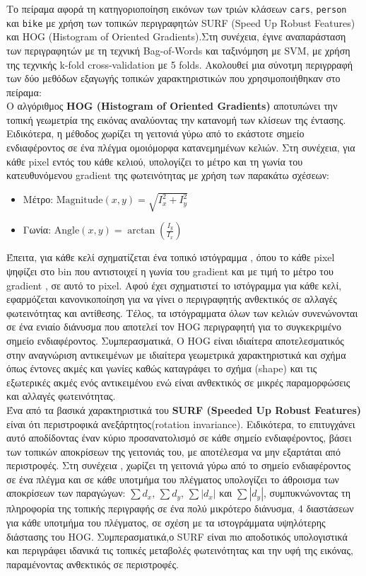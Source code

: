 \documentclass[12pt, a4paper]{article}
\begin{document}
 Το πείραμα αφορά τη
κατηγοριοποίηση εικόνων των τριών κλάσεων \texttt{cars}, \texttt{person} και
\texttt{bike} με χρήση των τοπικών περιγραφητών SURF (Speed Up Robust Features)
και HOG (Histogram of Oriented Gradients).Στη συνέχεια, έγινε αναπαράσταση των περιγραφητών με τη τεχνική Bag-of-Words και ταξινόμηση με 
SVM, με χρήση της τεχνικής k-fold cross-validation με 5 folds.
Ακολουθεί μια σύνοτμη περιγρραφή των δύο μεθόδων εξαγωγής τοπικών χαρακτηριστικών που χρησιμοποιήθηκαν στο πείραμα:\\
Ο αλγόριθμος \textbf{HOG (Histogram of Oriented Gradients)} αποτυπώνει την τοπική γεωμετρία της εικόνας αναλύοντας την κατανομή των κλίσεων της έντασης.
Ειδικότερα, η μέθοδος χωρίζει τη γειτονιά γύρω από το εκάστοτε σημείο ενδιαφέροντος σε ένα πλέγμα ομοιόμορφα κατανεμημένων κελιών. Στη συνέχεια, για κάθε pixel εντός του κάθε κελιού,
υπολογίζει το μέτρο και τη γωνία του κατευθυνόμενου gradient της φωτεινότητας με χρήση των παρακάτω σχέσεων:
\begin{itemize}
    \item Μέτρο: $\displaystyle \mathrm{Magnitude}(x,y) = \sqrt{I_x^2 + I_y^2}$
    
    \vspace{0.3cm}
    
    \item Γωνία: $\displaystyle \mathrm{Angle}(x,y) = \arctan\!\left(\frac{I_y}{I_x}\right)$
\end{itemize}
Έπειτα, για κάθε κελί σχηματίζεται ένα τοπικό ιστόγραμμα , όπου το κάθε pixel ψηφίζει στο bin που αντιστοιχεί η γωνία του gradient και με τιμή το μέτρο του gradient , σε αυτό το pixel. Αφού έχει σχηματιστεί το ιστόγραμμα για κάθε κελί, εφαρμόζεται κανονικοποίηση για να γίνει ο περιγραφητής ανθεκτικός σε αλλαγές φωτεινότητας και αντίθεσης. Τέλος, τα ιστόγραμματα όλων των κελιών συνενώνονται σε ένα ενιαίο διάνυσμα που αποτελεί τον HOG περιγραφητή για το συγκεκριμένο σημείο ενδιαφέροντος.
Συμπερασματικά, Ο HOG είναι ιδιαίτερα αποτελεσματικός στην αναγνώριση αντικειμένων με ιδιαίτερα γεωμετρικά χαρακτηριστικά και σχήμα όπως έντονες ακμές και γωνίες καθώς καταγράφει το σχήμα (shape) και τις εξωτερικές ακμές ενός αντικειμένου ενώ είναι ανθεκτικός σε μικρές παραμορφώσεις και αλλαγές φωτεινότητας.\\

Ένα από τα βασικά χαρακτηριστικά του \textbf{SURF (Speeded Up Robust Features)} είναι ότι περιστροφικά ανεξάρτητος(rotation invariance). Ειδικότερα, το επιτυγχάνει αυτό αποδίδοντας έναν κύριο προσανατολισμό σε κάθε σημείο ενδιαφέροντος, βάσει των τοπικών αποκρίσεων της γειτονιάς του, με αποτέλεσμα να μην εξαρτάται από περιστροφές.
Στη συνέχεια , χωρίζει τη γειτονιά γύρω από το σημείο ενδιαφέροντος σε ένα πλέγμα και σε κάθε υποτμήμα του πλέγματος υπολογίζει το άθροισμα των αποκρίσεων των παραγώγων: $\sum d_x$, $\sum d_y$, $\sum |d_x|$ και $\sum |d_y|$, συμπυκνώνοντας τη πληροφορία της τοπικής περιγραφής σε ένα πολύ μικρότερο διάνυσμα, 4 διαστάσεων για κάθε υποτμήμα του πλέγματος, σε σχέση με τα ιστογράμματα υψηλότερης διάστασης του HOG.
Συμπερασματικά,ο SURF είναι πιο αποδοτικός υπολογιστικά και περιγράφει ιδανικά τις τοπικές μεταβολές φωτεινότητας και την υφή της εικόνας, παραμένοντας ανθεκτικός σε περιστροφές.
\end{document}
